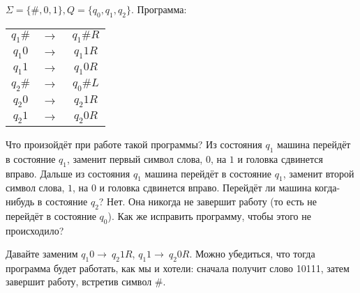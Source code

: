 \begin{example}
	$\Sigma = \{\#, 0, 1 \}, Q = \{q_0, q_1, q_2\}$. Программа:
	\begin{tabular}{c c c} 
		$q_{1}\#$ & $\to\ $& $q_{1}\#R$ \\ $q_{1}0$ & $\to\ $& $q_{1}1R$ \\ $q_{1}1$ & $\to\ $& $q_{1}0R$ \\
		$q_{2}\#$ & $\to\ $&
		$q_{0}\#L$ \\ $q_{2}0$ & $\to\ $& $q_{2}1R$ \\ $q_{2}1$ & $\to\ $& $q_{2}0R$ \\ 
	\end{tabular}
	\par Что произойдёт при работе такой программы?  Из состояния $q_{1}$ машина перейдёт в состояние $q_{1}$, заменит
	первый символ слова, $0$, на $1$ и головка сдвинется вправо. Дальше из состояния $q_{1}$ машина перейдёт в
	состояние $q_{1}$, заменит второй символ слова, $1$, на $0$ и головка сдвинется вправо. Перейдёт ли машина
	когда-нибудь в состояние $q_{2}$? Нет. Она никогда не завершит работу (то есть не перейдёт в состояние
	$q_{0}$). Как же исправить программу, чтобы этого не происходило? 
	\par Давайте заменим $q_{1}0 \to\ q_{2}1R$, $q_{1}1 \to\ q_{2}0R$. Можно убедиться, что тогда программа будет
	работать, как мы и хотели: сначала получит слово 10111, затем завершит работу, встретив символ $\#$.
\end{example}

